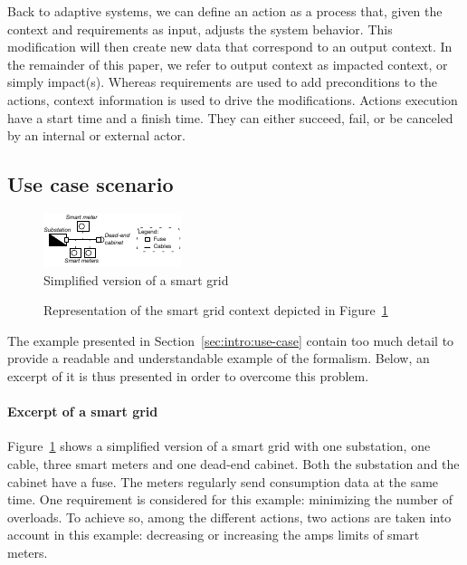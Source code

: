 Back to adaptive systems, we can define an action as a process that, given the context and requirements as input, adjusts the system behavior.
This modification will then create new data that correspond to an output context. In the remainder of this paper, we refer to output context as impacted context, or simply impact(s).
Whereas requirements are used to add preconditions to the actions, context information is used to drive the modifications.
Actions execution have a start time and a finish time. They can either succeed, fail, or be canceled by an internal or external actor.


\subsection{Use case scenario}
\label{sec:tkm:intro:uc}

\begin{figure}
	\centering
	\includegraphics[width=0.5\linewidth]{img/chapt-tkm/formalism/excerptSG}
	\caption{Simplified version of a smart grid}
	\label{fig:tkm:excerptSG}
\end{figure}

\begin{figure}
	\caption{Representation of the smart grid context depicted in Figure~\ref{fig:tkm:excerptSG}}
	\label{fig:tkm:contextFormExample}
\end{figure}


The example presented in Section~\ref{sec:intro:use-case} contain too much detail to provide a readable and understandable example of the formalism.
Below, an excerpt of it is thus presented in order to overcome this problem.


\paragraph{Excerpt of a smart grid}
Figure~\ref{fig:tkm:excerptSG} shows a simplified version of a smart grid with one substation, one cable, three smart meters and one dead-end cabinet.
Both the substation and the cabinet have a fuse.
The meters regularly send consumption data at the same time.
One requirement is considered for this example: minimizing the number of overloads.
To achieve so, among the different actions, two actions are taken into account in this example: decreasing or increasing the amps limits of smart meters.

